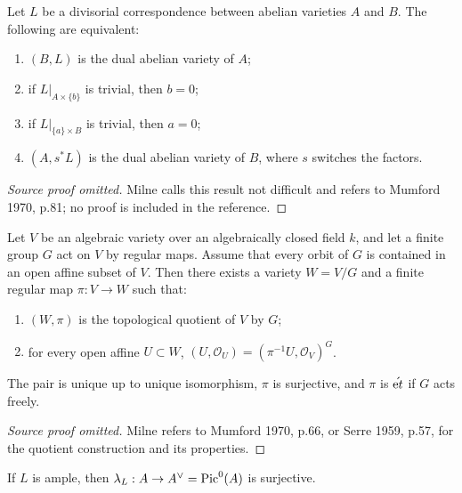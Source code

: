 \begin{theorem}
\label{thm:milne-dual-divisorial-criterion}

Let $L$ be a divisorial correspondence between abelian varieties $A$ and $B$.
The following are equivalent:
\begin{enumerate}
\item $(B,L)$ is the dual abelian variety of $A$;
\item if $L|_{A\times\{b\}}$ is trivial, then $b=0$;
\item if $L|_{\{a\}\times B}$ is trivial, then $a=0$;
\item $(A,s^*L)$ is the dual abelian variety of $B$, where $s$ switches the
factors.
\end{enumerate}
\end{theorem}

\begin{proof}[Source proof omitted]
Milne calls this result not difficult and refers to Mumford 1970, p.81; no
proof is included in the reference.
\end{proof}

\begin{proposition}
\label{prop:milne-finite-quotient}

Let $V$ be an algebraic variety over an algebraically closed field $k$, and let
a finite group $G$ act on $V$ by regular maps.  Assume that every orbit of $G$
is contained in an open affine subset of $V$.  Then there exists a variety
$W=V/G$ and a finite regular map $\pi:V\to W$ such that:
\begin{enumerate}
\item $(W,\pi)$ is the topological quotient of $V$ by $G$;
\item for every open affine $U\subset W$,
$(U,\mathcal O_U)=(\pi^{-1}U,\mathcal O_V)^G$.
\end{enumerate}
The pair is unique up to unique isomorphism, $\pi$ is surjective, and $\pi$
is $\acute{\mathrm{e}t}$ if $G$ acts freely.
\end{proposition}

\begin{proof}[Source proof omitted]
Milne refers to Mumford 1970, p.66, or Serre 1959, p.57, for the quotient
construction and its properties.
\end{proof}

\begin{proposition}
\label{prop:milne-lambda-ample}

If $L$ is ample, then $\lambda_L:A\to A^\vee=\operatorname{Pic}^0(A)$ is surjective.
\end{proposition}

